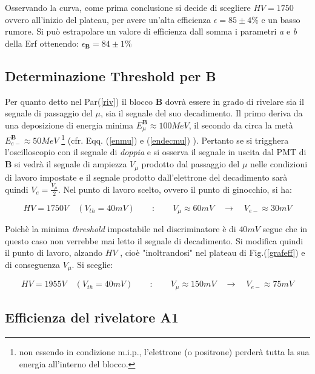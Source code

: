\documentclass[12pt,a4paper,openright,twoside]{article}
\numberwithin{equation}{section} %
\begin{document}
Osservando la curva, come prima conclusione si decide di scegliere $HV=1750$ ovvero all'inizio del plateau, per avere un'alta efficienza $\epsilon=85 \pm 4 \%$ e un basso rumore.
Si può estrapolare un valore di efficienza dall somma i parametri \textit{a} e \textit{b} della Erf ottenendo: $\epsilon_{\mathbf{B}}=84 \pm 1 \%$

\subsection{Determinazione Threshold per \textbf{B}}

Per quanto detto nel Par(\ref{riv}) il blocco \textbf{B} dovrà essere in grado di rivelare sia il segnale di passaggio del $\mu$, sia il segnale del suo decadimento.
Il primo deriva da una deposizione di energia minima $E_{\mu} ^{\textbf{B}} \approx 100 MeV$, il secondo da circa la metà $E_{e-} ^{\textbf{B}} \approx 50 MeV$
\footnote{non essendo in condizione m.i.p., l'elettrone (o positrone) perderà tutta la sua energia all'interno del blocco.} (cfr. Eqq. (\ref{enmu}) e (\ref{endecmu}) ).
Pertanto se si trigghera l'oscilloscopio con il segnale di \textit{doppia} e si osserva il segnale in uscita dal PMT di \textbf{B} si vedrà il segnale di ampiezza $V_{\mu}$ prodotto dal passaggio del $\mu$ nelle condizioni di lavoro impostate e il segnale prodotto dall'elettrone del decadimento sarà quindi $V_{e}=\frac{V_{\mu}}{2}$. Nel punto di lavoro scelto, ovvero il punto di ginocchio, si ha:

\begin{equation}
HV=1750V \quad (V_{th}=40mV) \qquad \mathbf{:} \qquad V_{\mu} \approx 60 mV \quad\rightarrow \quad V_{e-} \approx 30 mV
\end{equation}

Poichè la minima \textit{threshold} impostabile nel discriminatore è di $40mV$ segue che in questo caso non verrebbe mai letto il segnale di decadimento. Si modifica quindi il punto di lavoro, alzando $HV$ , cioè "inoltrandosi" nel plateau di Fig.(\ref{grafeff}) e di conseguenza $V_{\mu}$. Si sceglie:

\begin{equation}
HV=1955V \quad (V_{th}=40mV) \qquad \mathbf{:} \qquad V_{\mu} \approx 150 mV \quad\rightarrow \quad V_{e-} \approx 75 mV
\end{equation}

\subsection{Efficienza del rivelatore \textbf{A1}}
\end{document}

